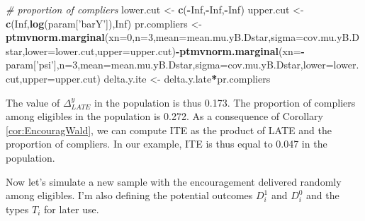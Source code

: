 \documentclass[]{book}
\newenvironment{Shaded}{\begin{snugshade}}{\end{snugshade}}
\newcommand{\KeywordTok}[1]{\textcolor[rgb]{0.13,0.29,0.53}{\textbf{#1}}}
\newcommand{\DataTypeTok}[1]{\textcolor[rgb]{0.13,0.29,0.53}{#1}}
\newcommand{\DecValTok}[1]{\textcolor[rgb]{0.00,0.00,0.81}{#1}}
\newcommand{\StringTok}[1]{\textcolor[rgb]{0.31,0.60,0.02}{#1}}
\newcommand{\CommentTok}[1]{\textcolor[rgb]{0.56,0.35,0.01}{\textit{#1}}}
\newcommand{\OtherTok}[1]{\textcolor[rgb]{0.56,0.35,0.01}{#1}}
\newcommand{\OperatorTok}[1]{\textcolor[rgb]{0.81,0.36,0.00}{\textbf{#1}}}
\newcommand{\NormalTok}[1]{#1}
\theoremstyle{definition}
\theoremstyle{definition}
\theoremstyle{definition}
\theoremstyle{remark}
\begin{document}
\begin{Shaded}
\begin{Highlighting}[]
\CommentTok{# proportion of compliers}
\NormalTok{lower.cut <-}\StringTok{ }\KeywordTok{c}\NormalTok{(}\OperatorTok{-}\OtherTok{Inf}\NormalTok{,}\OperatorTok{-}\OtherTok{Inf}\NormalTok{,}\OperatorTok{-}\OtherTok{Inf}\NormalTok{)}
\NormalTok{upper.cut <-}\StringTok{ }\KeywordTok{c}\NormalTok{(}\OtherTok{Inf}\NormalTok{,}\KeywordTok{log}\NormalTok{(param[}\StringTok{'barY'}\NormalTok{]),}\OtherTok{Inf}\NormalTok{)}
\NormalTok{pr.compliers <-}\StringTok{ }\KeywordTok{ptmvnorm.marginal}\NormalTok{(}\DataTypeTok{xn=}\DecValTok{0}\NormalTok{,}\DataTypeTok{n=}\DecValTok{3}\NormalTok{,}\DataTypeTok{mean=}\NormalTok{mean.mu.yB.Dstar,}\DataTypeTok{sigma=}\NormalTok{cov.mu.yB.Dstar,}\DataTypeTok{lower=}\NormalTok{lower.cut,}\DataTypeTok{upper=}\NormalTok{upper.cut)}\OperatorTok{-}\KeywordTok{ptmvnorm.marginal}\NormalTok{(}\DataTypeTok{xn=}\OperatorTok{-}\NormalTok{param[}\StringTok{'psi'}\NormalTok{],}\DataTypeTok{n=}\DecValTok{3}\NormalTok{,}\DataTypeTok{mean=}\NormalTok{mean.mu.yB.Dstar,}\DataTypeTok{sigma=}\NormalTok{cov.mu.yB.Dstar,}\DataTypeTok{lower=}\NormalTok{lower.cut,}\DataTypeTok{upper=}\NormalTok{upper.cut)}
\NormalTok{delta.y.ite <-}\StringTok{ }\NormalTok{delta.y.late}\OperatorTok{*}\NormalTok{pr.compliers}
\end{Highlighting}
\end{Shaded}

The value of \(\Delta^y_{LATE}\) in the population is thus 0.173. The
proportion of compliers among eligibles in the population is 0.272. As a
consequence of Corollary \ref{cor:EncouragWald}, we can compute ITE as
the product of LATE and the proportion of compliers. In our example, ITE
is thus equal to 0.047 in the population.

Now let's simulate a new sample with the encouragement delivered
randomly among eligibles. I'm also defining the potential outcomes
\(D^1_i\) and \(D^0_i\) and the types \(T_i\) for later use.
\end{document}
